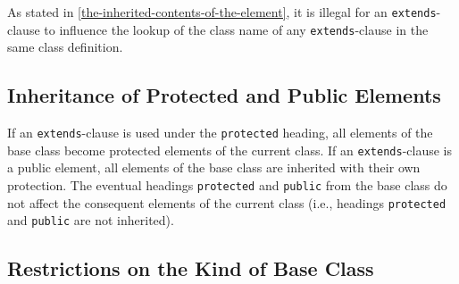 \begin{nonnormative}
As stated in \cref{the-inherited-contents-of-the-element}, it is illegal for an \lstinline!extends!-clause to influence the lookup of the class name of any \lstinline!extends!-clause in the same class definition.
\end{nonnormative}


\subsection{Inheritance of Protected and Public Elements}\label{inheritance-of-protected-and-public-elements}

If an \lstinline!extends!-clause is used under the \lstinline!protected! heading, all elements of the base class become protected elements of the current class.
If an \lstinline!extends!-clause is a public element, all elements of the base class are inherited with their own protection.
The eventual headings \lstinline!protected! and \lstinline!public! from the base class do not affect the consequent elements of the current class (i.e., headings \lstinline!protected! and \lstinline!public! are not inherited).


\subsection{Restrictions on the Kind of Base Class}\label{restrictions-on-the-kind-of-base-class}

